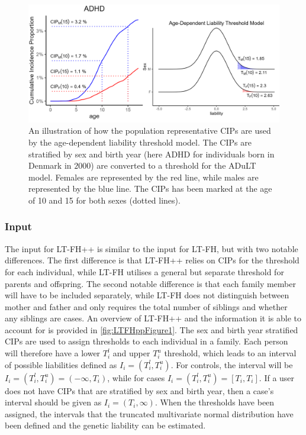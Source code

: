 \begin{figure}[h]
	\includegraphics[width=\textwidth]{methods/adult_top.png}
	\caption[Age-dependent liability threshold model and its relationship to the CIPs]{An illustration of how the population representative CIPs are used by the age-dependent liability threshold model. The CIPs are stratified by sex and birth year (here ADHD for individuals born in Denmark in $ 2000 $) are converted to a threshold for the ADuLT model. Females are represented by the red line, while males are represented by the blue line. The CIPs has been marked at the age of 10 and 15 for both sexes (dotted lines).}
	\label{fig:adult_connection_to_CIPs}
\end{figure}

\subsubsection{Input}
The input for LT-FH++ is similar to the input for LT-FH, but with two notable differences. The first difference is that LT-FH++ relies on CIPs for the threshold for each individual, while LT-FH utilises a general but separate threshold for parents and offspring. The second notable difference is that each family member will have to be included separately, while LT-FH does not distinguish between mother and father and only requires the total number of siblings and whether any siblings are cases. An overview of LT-FH++ and the information it is able to account for is provided in \cref{fig:LTFHppFigure1}. The sex and birth year stratified CIPs are used to assign thresholds to each individual in a family. Each person will therefore have a lower $ T_i^l $ and upper $ T_i^u $ threshold, which leads to an interval of possible liabilities defined as $ I_i = (T_i^l, T_i^u) $. For controls, the interval will be $ I_i = (T_i^l,T_i^u) = (-\infty, T_i) $, while for cases $ I_i = (T_i^l,T_i^u) = [T_i,T_i] $. If a user does not have CIPs that are stratified by sex and birth year, then a case's interval should be given as $ I_i = (T_i, \infty) $. When the thresholds have been assigned, the intervals that the truncated multivariate normal distribution have been defined and the genetic liability can be estimated. 

